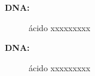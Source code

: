 \begin{description}
	\item[\textbf{DNA:}] ácido xxxxxxxxx
	\item[\textbf{DNA:}] ácido xxxxxxxxx
\end{description}